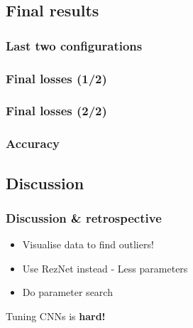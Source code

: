 \documentclass{beamer}
\begin{document}
\subsection{Final results}
\begin{frame}
  \frametitle{Last two configurations}
  
\end{frame}

\begin{frame}
  \frametitle{Final losses (1/2)}
  
\end{frame}

\begin{frame}
  \frametitle{Final losses (2/2)}
  
\end{frame}

\begin{frame}
  \frametitle{Accuracy}
  
\end{frame}

\subsection{Discussion}
\begin{frame}
  \frametitle{Discussion \& retrospective}
  \begin{itemize}
    \item Visualise data to find outliers!
    \item Use RezNet instead - Less parameters
    \item Do parameter search
  \end{itemize}
  Tuning CNNs is \textbf{hard!}
\end{frame}
\end{document}
